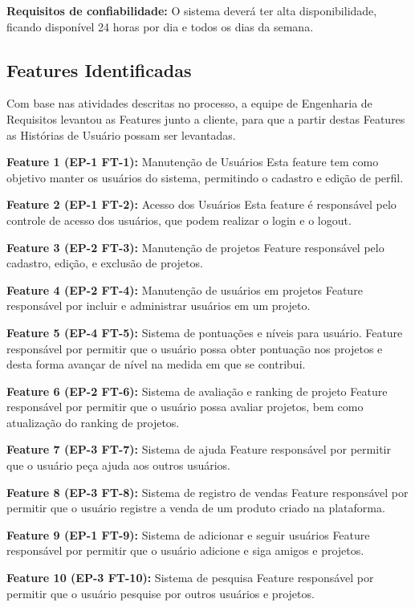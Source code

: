 \textbf{Requisitos de confiabilidade:} O sistema deverá ter alta disponibilidade, ficando disponível 24 horas por dia e todos os dias da semana.

\subsection{Features Identificadas}
Com base nas atividades descritas no processo, a equipe de Engenharia de Requisitos levantou as Features junto a cliente, para que a partir destas Features as Histórias de Usuário possam ser levantadas.

\textbf{Feature 1 (EP-1 FT-1):} Manutenção de Usuários
Esta feature tem como objetivo manter os usuários do sistema, permitindo o cadastro e edição de perfil.

\textbf{Feature 2 (EP-1 FT-2):} Acesso dos Usuários
Esta feature é responsável pelo controle de acesso dos usuários, que podem realizar o login e o logout.

\textbf{Feature 3 (EP-2 FT-3):} Manutenção de projetos
Feature responsável pelo cadastro, edição, e exclusão de projetos.

\textbf{Feature 4 (EP-2 FT-4):} Manutenção de usuários em projetos
Feature responsável por incluir e administrar usuários em um projeto.

\textbf{Feature 5 (EP-4 FT-5):} Sistema de pontuações e níveis para usuário.
Feature responsável por permitir que o usuário possa obter pontuação nos projetos e desta forma avançar de nível na medida em que se contribui.

\textbf{Feature 6 (EP-2 FT-6):} Sistema de avaliação e ranking de projeto
Feature responsável por permitir que o usuário possa avaliar projetos, bem como atualização do ranking de projetos.

\textbf{Feature 7 (EP-3 FT-7):} Sistema de ajuda
Feature responsável por permitir que o usuário peça ajuda aos outros usuários.

\textbf{Feature 8 (EP-3 FT-8):} Sistema de registro de vendas
Feature responsável por permitir que o usuário registre a venda de um produto criado na plataforma.

\textbf{Feature 9 (EP-1 FT-9):} Sistema de adicionar e seguir usuários
Feature responsável por permitir que o usuário adicione e siga amigos e projetos.

\textbf{Feature 10 (EP-3 FT-10):} Sistema de pesquisa
Feature responsável por permitir que o usuário pesquise por outros usuários e projetos.

